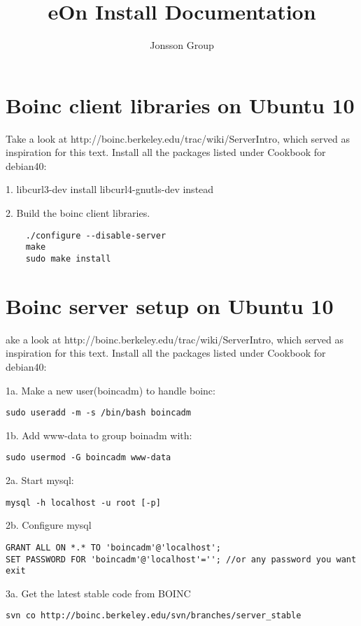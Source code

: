 \documentclass{article}
\begin{document}
\title{eOn Install Documentation}
\author{Jonsson	 Group}
\maketitle
\section{Boinc client libraries on Ubuntu 10}

Take a look at http://boinc.berkeley.edu/trac/wiki/ServerIntro, which served as inspiration for this text.
Install all the packages listed under Cookbook for debian40:

1. libcurl3-dev install libcurl4-gnutls-dev instead

2. Build the boinc client libraries.
\begin{verbatim}
	./configure --disable-server
	make
	sudo make install
\end{verbatim}

\section{Boinc server setup on Ubuntu 10}

ake a look at http://boinc.berkeley.edu/trac/wiki/ServerIntro, which served as inspiration for this text.
Install all the packages listed under Cookbook for debian40:

1a. Make a new user(boincadm) to handle boinc:
\begin{verbatim}	
sudo useradd -m -s /bin/bash boincadm
\end{verbatim}

1b. Add www-data to group boinadm with:
\begin{verbatim}
sudo usermod -G boincadm www-data
\end{verbatim}

2a. Start mysql:
\begin{verbatim}
mysql -h localhost -u root [-p] 
\end{verbatim}

2b. Configure mysql
\begin{verbatim}
GRANT ALL ON *.* TO 'boincadm'@'localhost';
SET PASSWORD FOR 'boincadm'@'localhost'=''; //or any password you want
exit 
\end{verbatim}

3a. Get the latest stable code from BOINC
\begin{verbatim}
svn co http://boinc.berkeley.edu/svn/branches/server_stable
\end{verbatim}
\end{document}
